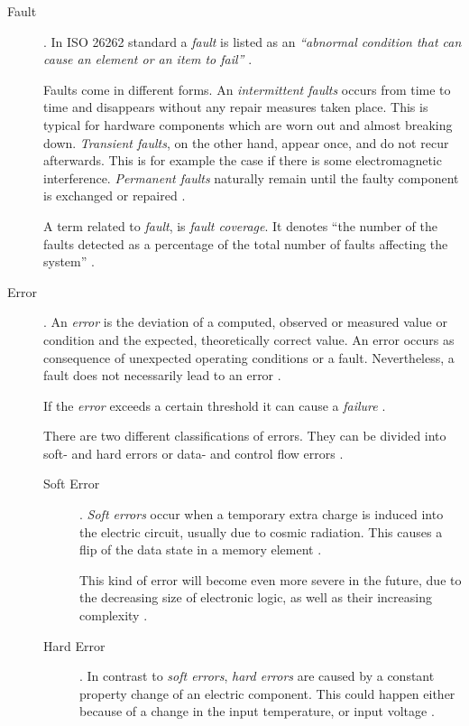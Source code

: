 \begin{description}
\item [Fault] .
In ISO 26262 standard a \emph{fault} is listed as an \emph{``abnormal condition that can cause an element or an item to fail''} \cite{iso26262:1} \cite{autosar_glossary}. 

Faults come in different forms. An \emph{intermittent faults} occurs from time to time and disappears without any repair measures taken place. This is typical for hardware components which are worn out and almost breaking down. \emph{Transient faults}, on the other hand, appear once, and do not recur afterwards. This is for example the case if there is some electromagnetic interference. \emph{Permanent faults} naturally remain until the faulty component is exchanged or repaired \cite{iso26262:1}.

A term related to \emph{fault}, is \emph{fault coverage}. It denotes ``the number of the faults detected as a percentage of the total number of faults affecting the system'' \cite{elattar2007}.


\item [Error] .
An \emph{error} is the deviation of a computed, observed or measured value or condition and the expected, theoretically correct value. An error occurs as consequence of unexpected operating conditions or a fault.
Nevertheless, a fault does not necessarily lead to an error \cite{iso26262:1} \cite{nelson} \cite{autosar_glossary}.

If the \emph{error} exceeds a certain threshold it can cause a \emph{failure} \cite{autosar_glossary}.

There are two different classifications of errors. They can be divided into soft- and hard errors or data- and control flow errors \cite{israr2014} \cite{elattar2007}.
	\begin{description}
	\item [Soft Error] .
	\emph{Soft errors} occur when a temporary extra charge is induced into the electric circuit, usually due to cosmic radiation. This causes a flip of the data state in a memory element \cite{israr2014} \cite{elattar2007}.

	This kind of error will become even more severe in the future, due to the decreasing size of electronic logic, as well as their increasing complexity \cite{elattar2007}.

	\item [Hard Error] .
	In contrast to \emph{soft errors}, \emph{hard errors} are caused by a constant property change of an electric component. This could happen either because of a change in the input temperature, or input voltage \cite{israr2014}.
	\end{description}


\end{description}

